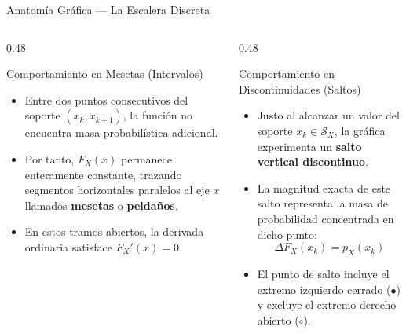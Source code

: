 \documentclass[10pt, aspectratio=169]{beamer}
\begin{document}
\begin{frame}{Anatomía Gráfica — La Escalera Discreta}
  \begin{columns}[T]
    \begin{column}{0.48\textwidth}
      \begin{block}{Comportamiento en Mesetas (Intervalos)}
        \small
        \begin{itemize}\itemsep=0.1cm
          \item Entre dos puntos consecutivos del soporte $(x_k, x_{k+1})$, la función no encuentra masa probabilística adicional.
          \item Por tanto, $F_X(x)$ permanece enteramente constante, trazando segmentos horizontales paralelos al eje $x$ llamados \textbf{mesetas} o \textbf{peldaños}.
          \item En estos tramos abiertos, la derivada ordinaria satisface $F_X'(x) = 0$.
        \end{itemize}
      \end{block}
    \end{column}
    \begin{column}{0.48\textwidth}
      \begin{alertblock}{Comportamiento en Discontinuidades (Saltos)}
        \small
        \begin{itemize}\itemsep=0.1cm
          \item Justo al alcanzar un valor del soporte $x_k \in \mathcal{S}_X$, la gráfica experimenta un \textbf{salto vertical discontinuo}.
          \item La magnitud exacta de este salto representa la masa de probabilidad concentrada en dicho punto:
          $$\Delta F_X(x_k) = p_X(x_k)$$
          \item El punto de salto incluye el extremo izquierdo cerrado ($\bullet$) y excluye el extremo derecho abierto ($\circ$).
        \end{itemize}
      \end{alertblock}
    \end{column}
  \end{columns}
\end{frame}
\end{document}
